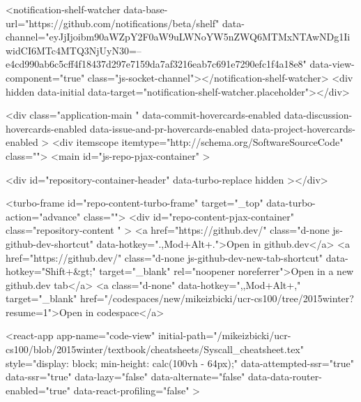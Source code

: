    
  <notification-shelf-watcher data-base-url="https://github.com/notifications/beta/shelf" data-channel="eyJjIjoibm90aWZpY2F0aW9uLWNoYW5nZWQ6MTMxNTAwNDg1IiwidCI6MTc4MTQ3NjUyN30=--e4cd990ab6c5cff4f18437d297e7159da7af3216eab7c691e7290efc1f4a18e8" data-view-component="true" class="js-socket-channel"></notification-shelf-watcher>
  <div hidden data-initial data-target="notification-shelf-watcher.placeholder"></div>






  <div
    class="application-main "
    data-commit-hovercards-enabled
    data-discussion-hovercards-enabled
    data-issue-and-pr-hovercards-enabled
    data-project-hovercards-enabled
  >
        <div itemscope itemtype="http://schema.org/SoftwareSourceCode" class="">
    <main id="js-repo-pjax-container" >
      
      







    
  <div id="repository-container-header" data-turbo-replace hidden ></div>



<turbo-frame id="repo-content-turbo-frame" target="_top" data-turbo-action="advance" class="">
    <div id="repo-content-pjax-container" class="repository-content " >
      <a href="https://github.dev/" class="d-none js-github-dev-shortcut" data-hotkey=".,Mod+Alt+.">Open in github.dev</a>
  <a href="https://github.dev/" class="d-none js-github-dev-new-tab-shortcut" data-hotkey="Shift+&gt;" target="_blank" rel="noopener noreferrer">Open in a new github.dev tab</a>
    <a class="d-none" data-hotkey=",,Mod+Alt+," target="_blank" href="/codespaces/new/mikeizbicki/ucr-cs100/tree/2015winter?resume=1">Open in codespace</a>




    
      
    








<react-app
  app-name="code-view"
  initial-path="/mikeizbicki/ucr-cs100/blob/2015winter/textbook/cheatsheets/Syscall_cheatsheet.tex"
  style="display: block; min-height: calc(100vh - 64px);"
  data-attempted-ssr="true"
  data-ssr="true"
  data-lazy="false"
  data-alternate="false"
  data-data-router-enabled="true"
  data-react-profiling="false"
>
  
